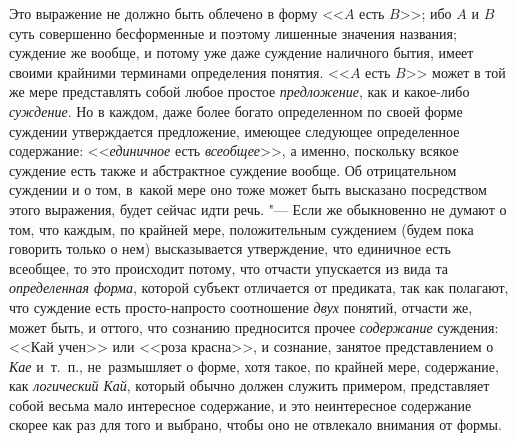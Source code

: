Это выражение не должно быть облечено в форму <<$A$ есть $B$>>; ибо $A$ и $B$
суть совершенно бесформенные и поэтому лишенные значения названия; суждение же
вообще, и потому уже даже суждение наличного бытия, имеет своими крайними
терминами определения понятия. <<$A$ есть $B$>> может в той же мере
представлять собой любое простое {\em предложение}, как и какое-либо
{\em суждение}. Но в каждом, даже более богато определенном по своей форме
суждении утверждается предложение, имеющее следующее определенное содержание:
<<{\em единичное} есть {\em всеобщее}>>, а именно, поскольку всякое суждение
есть также и абстрактное суждение вообще. Об отрицательном суждении и о том,
в~какой мере оно тоже может быть высказано посредством этого выражения, будет
сейчас идти речь. "--- Если же обыкновенно не думают о том, что каждым, по
крайней мере, положительным суждением (будем пока говорить только о нем)
высказывается утверждение, что единичное есть всеобщее, то это происходит
потому, что отчасти упускается из вида та {\em определенная форма}, которой
субъект отличается от предиката, так как полагают, что суждение есть
просто-напросто соотношение {\em двух} понятий, отчасти же, может быть, и
оттого, что сознанию предносится прочее {\em содержание} суждения: <<Кай учен>>
или <<роза красна>>, и сознание, занятое представлением о {\em Кае} и~т.~п.,
не~размышляет о форме, хотя такое, по крайней мере, содержание, как {\em
логический Кай}, который обычно должен служить примером, представляет собой
весьма мало интересное содержание, и это неинтересное содержание скорее как раз
для того и выбрано, чтобы оно не отвлекало внимания от формы.

